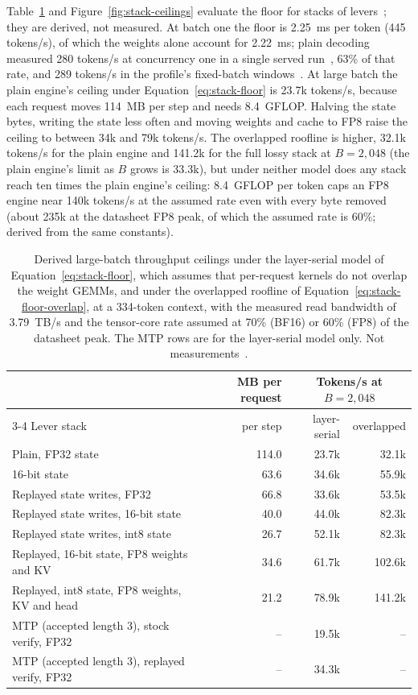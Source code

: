 Table~\ref{tab:stack-ceilings} and Figure~\ref{fig:stack-ceilings} evaluate the floor for stacks of levers~; they are derived, not measured. At batch one the floor is 2.25~ms per token (445 tokens/s), of which the weights alone account for 2.22~ms; plain decoding measured 280 tokens/s at concurrency one in a single served run~, 63\% of that rate, and 289 tokens/s in the profile's fixed-batch windows~. At large batch the plain engine's ceiling under Equation~\eqref{eq:stack-floor} is 23.7k tokens/s, because each request moves 114~MB per step and needs 8.4~GFLOP. Halving the state bytes, writing the state less often and moving weights and cache to FP8 raise the ceiling to between 34k and 79k tokens/s. The overlapped roofline is higher, 32.1k tokens/s for the plain engine and 141.2k for the full lossy stack at $B=2{,}048$ (the plain engine's limit as $B$ grows is 33.3k), but under neither model does any stack reach ten times the plain engine's ceiling: 8.4~GFLOP per token caps an FP8 engine near 140k tokens/s at the assumed rate even with every byte removed (about 235k at the datasheet FP8 peak, of which the assumed rate is 60\%; derived from the same constants).

\begin{table}[htbp]
\tablefont\centering
\caption{Derived large-batch throughput ceilings under the layer-serial model of Equation~\eqref{eq:stack-floor}, which assumes that per-request kernels do not overlap the weight GEMMs, and under the overlapped roofline of Equation~\eqref{eq:stack-floor-overlap}, at a 334-token context, with the measured read bandwidth of 3.79~TB/s and the tensor-core rate assumed at 70\% (BF16) or 60\% (FP8) of the datasheet peak. The MTP rows are for the layer-serial model only. Not measurements~.}
\label{tab:stack-ceilings}
\vskip 0.05in
\begin{tabular}{@{}lrrr@{}}\toprule
& MB per request & \multicolumn{2}{c}{Tokens/s at $B=2{,}048$}\\\cmidrule(l){3-4}
Lever stack & per step & layer-serial & overlapped\\\midrule
Plain, FP32 state & 114.0 & 23.7k & 32.1k\\
16-bit state & 63.6 & 34.6k & 55.9k\\
Replayed state writes, FP32 & 66.8 & 33.6k & 53.5k\\
Replayed state writes, 16-bit state & 40.0 & 44.0k & 82.3k\\
Replayed state writes, int8 state & 26.7 & 52.1k & 82.3k\\
Replayed, 16-bit state, FP8 weights and KV & 34.6 & 61.7k & 102.6k\\
Replayed, int8 state, FP8 weights, KV and head & 21.2 & 78.9k & 141.2k\\
MTP (accepted length 3), stock verify, FP32 & -- & 19.5k & --\\
MTP (accepted length 3), replayed verify, FP32 & -- & 34.3k & --\\\bottomrule
\end{tabular}
\end{table}

